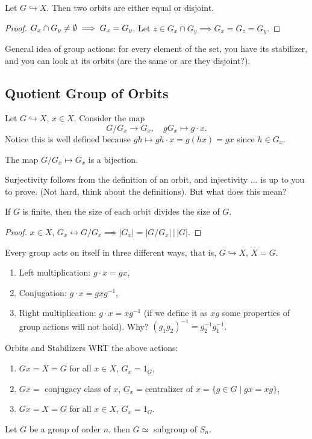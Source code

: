 \begin{lemma}
    Let $G \hookrightarrow X$. Then two orbits are either equal or disjoint.
\end{lemma}
\begin{proof}
    $G_x \cap G_y \neq \emptyset \implies  G_x=G_y$. Let $z\in G_x \cap G_y \implies G_x=G_z=G_y$.
\end{proof}
General idea of group actions: for every element of the set, you have its stabilizer, and you can look at its orbits (are the same or are they disjoint?).

\subsection{Quotient Group of Orbits}
Let $G \hookrightarrow X$, $x\in X$. Consider the map \[
G/G_x \to G_x, \quad gG_x \mapsto g\cdot x.
\]
Notice this is well defined because $gh \mapsto gh\cdot x = g(hx)=gx$ since $h\in G_x$.

\begin{claim}
    The map $G/G_x \mapsto G_x$ is a bijection.
\end{claim}
Surjectivity follows from the definition of an orbit, and injectivity ... is up to you to prove. (Not hard, think about the definitions). But what does this mean?
\begin{prop}
    If $G$ is finite, then the size of each orbit divides the size of $G$. 
\end{prop}
\begin{proof}
    $x\in X$, $G_x \leftrightarrow G/G_x \implies |G_x|=|G/G_x| \, \big| \, |G|$.
\end{proof}
\begin{example}
    Every group acts on itself in three different ways, that is, $G \hookrightarrow X, \, X=G$.
    \begin{enumerate}
        \item Left multiplication: $g\cdot x=gx$,
        \item Conjugation: $g\cdot x=gxg^{-1}$,
        \item Right multiplication: $g\cdot x=xg^{-1}$ (if we define it as $xg$ some properties of group actions will not hold). Why? $(g_1g_2)^{-1}=g_2^{-1}g_1^{-1}$.
    \end{enumerate}
    Orbits and Stabilizers WRT the above actions: 
    \begin{enumerate}
        \item $Gx=X=G$ for all $x\in X$, $G_x={1_G}$,
        \item  $Gx=$ conjugacy class of $x$, $G_x=$centralizer of $x = \{g\in G \mid gx=xg\} $,
        \item $Gx=X=G$ for all $x\in X$, $G_x={1_G}.$
    \end{enumerate}
\end{example}
\begin{prop}
    Let $G$ be a group of order $n$, then $G \simeq $ subgroup of $S_n$.
\end{prop}

